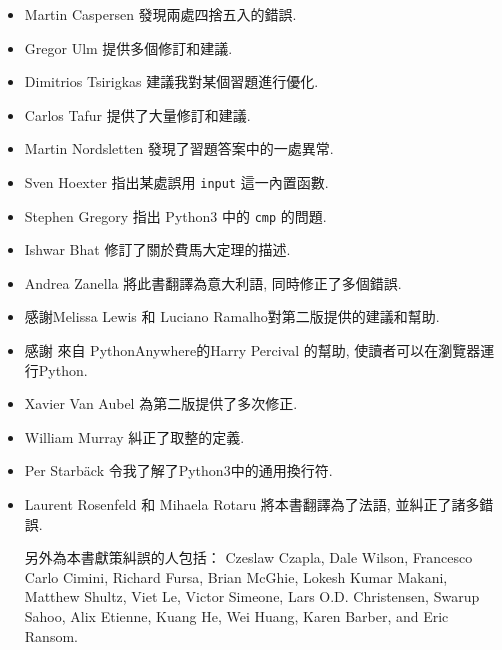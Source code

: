 \documentclass[10pt]{book}
\begin{document}
\begin{itemize}
\item Martin Caspersen 發現兩處四捨五入的錯誤. 

\item Gregor Ulm 提供多個修訂和建議. 

\item Dimitrios Tsirigkas 建議我對某個習題進行優化. 

\item Carlos Tafur 提供了大量修訂和建議. 

\item Martin Nordsletten 發現了習題答案中的一處異常. 

\item Sven Hoexter 指出某處誤用 {\tt input} 這一內置函數. 

\item Stephen Gregory 指出 Python3 中的 {\tt cmp} 的問題. 

\item Ishwar Bhat 修訂了關於費馬大定理的描述. 

\item Andrea Zanella 將此書翻譯為意大利語, 同時修正了多個錯誤. 


\item 感謝Melissa Lewis 和 Luciano Ramalho對第二版提供的建議和幫助. 

\item 感謝 來自 PythonAnywhere的Harry Percival 的幫助, 使讀者可以在瀏覽器運行Python. 

\item Xavier Van Aubel 為第二版提供了多次修正. 

\item William Murray 糾正了取整的定義. 

\item Per Starb{\"a}ck 令我了解了Python3中的通用換行符. 

\item Laurent Rosenfeld 和 Mihaela Rotaru 將本書翻譯為了法語, 並糾正了諸多錯誤. 


另外為本書獻策糾誤的人包括：
Czeslaw Czapla, Dale Wilson, Francesco Carlo Cimini,
Richard Fursa, Brian McGhie, Lokesh Kumar Makani, Matthew Shultz, Viet
Le, Victor Simeone, Lars O.D. Christensen, Swarup Sahoo, Alix Etienne,
Kuang He, Wei Huang, Karen Barber, and Eric Ransom. 



\end{itemize}

\normalsize
\clearemptydoublepage
\end{document}
